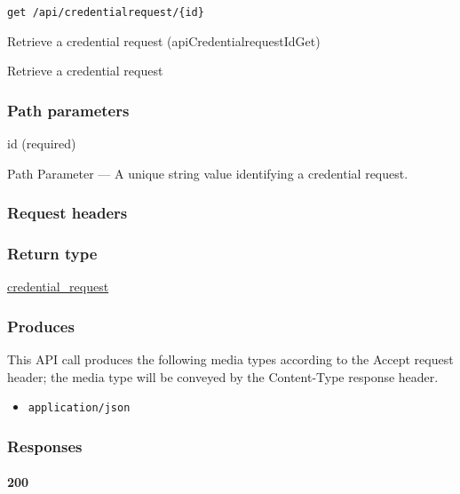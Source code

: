 \protect\hypertarget{apiCredentialrequestIdGet}{}{}

\begin{verbatim}
get /api/credentialrequest/{id}
\end{verbatim}

Retrieve a credential request ({apiCredentialrequestIdGet})

Retrieve a credential request

\hypertarget{path-parameters-35}{%
\subsubsection{Path parameters}\label{path-parameters-35}}

id (required)

{Path Parameter} --- A unique string value identifying a credential
request.

\hypertarget{request-headers-40}{%
\subsubsection{Request headers}\label{request-headers-40}}

\hypertarget{return-type-56}{%
\subsubsection{Return type}\label{return-type-56}}

\protect\hyperlink{credential_request}{credential\_request}

\hypertarget{produces-70}{%
\subsubsection{Produces}\label{produces-70}}

This API call produces the following media types according to the
{Accept} request header; the media type will be conveyed by the
{Content-Type} response header.

\begin{itemize}
\tightlist
\item
  \texttt{application/json}
\end{itemize}

\hypertarget{responses-70}{%
\subsubsection{Responses}\label{responses-70}}

\hypertarget{section-232}{%
\paragraph{200}\label{section-232}}

